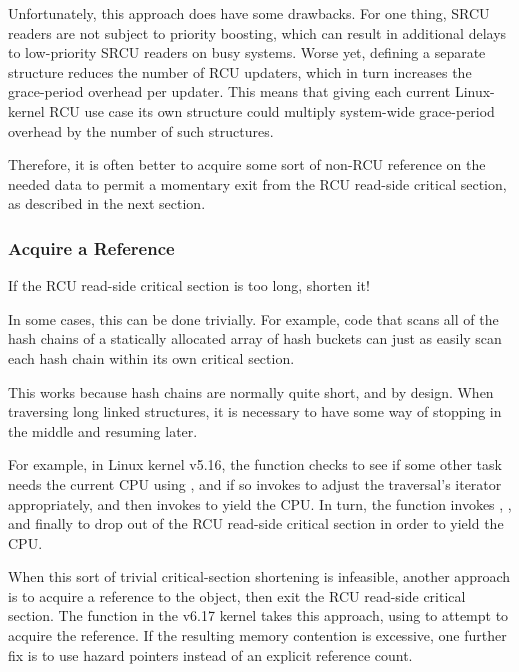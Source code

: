 Unfortunately, this approach does have some drawbacks.
For one thing, SRCU readers are not subject to priority boosting, which can
result in additional delays to low-priority SRCU readers on busy
systems.
Worse yet, defining a separate  structure reduces the
number of RCU updaters, which in turn increases the grace-period
overhead per updater.
This means that giving each current Linux-kernel RCU use case its own
 structure could multiply system-wide grace-period
overhead by the number of such structures.

Therefore, it is often better to acquire some sort of non-RCU reference
on the needed data to permit a momentary exit from the RCU read-side
critical section, as described in the next section.

\subsubsection{Acquire a Reference}
\label{sec:together:Acquire a Reference}

If the RCU read-side critical section is too long, shorten it!

In some cases, this can be done trivially.
For example, code that scans all of the hash chains of a statically
allocated array of hash buckets can just as easily scan each hash chain
within its own critical section.

This works because hash chains are normally quite short, and by design.
When traversing long linked structures, it is necessary to have some
way of stopping in the middle and resuming later.

For example, in Linux kernel v5.16, the 
function checks to see if some other task needs the current CPU
using , and if so invokes  to
adjust the traversal's iterator appropriately, and then invokes
 to yield the CPU\@.
In turn, the  function invokes ,
, and finally  to drop out of
the RCU read-side critical section in order to yield the CPU.

When this sort of trivial critical-section shortening is infeasible,
another approach is to acquire a reference to the object, then
exit the RCU read-side critical section.
The  function in the v6.17 kernel takes this approach,
using  to attempt to acquire the reference.
If the resulting memory contention is excessive, one further fix is to
use hazard pointers instead of an explicit reference count.

